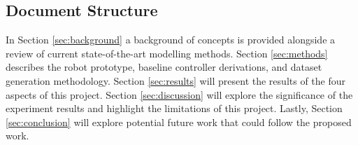\subsection{Document Structure}
In Section \ref{sec:background} a background of concepts is provided alongside a review of current state-of-the-art modelling methods. Section \ref{sec:methods} describes the robot prototype, baseline controller derivations, and dataset generation methodology. Section \ref{sec:results} will present the results of the four aspects of this project. Section \ref{sec:discussion} will explore the significance of the experiment results and highlight the limitations of this project. Lastly, Section \ref{sec:conclusion} will explore potential future work that could follow the proposed work. 